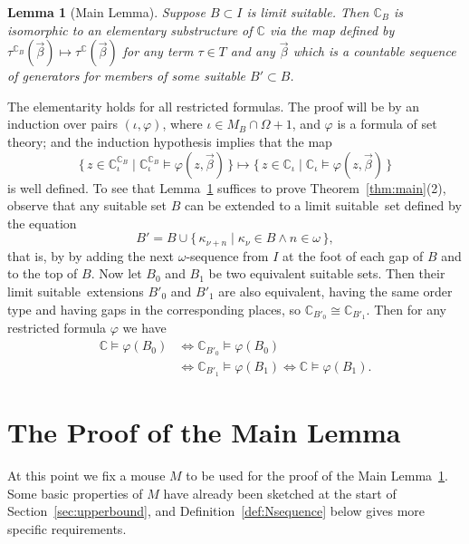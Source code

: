 \documentclass[
twoside,
]{article}
\newtheorem{lemma}[theorem]{Lemma}
\theoremstyle{definition}
\theoremstyle{remark}
\newcommand{\LS}{limit suitable}
\newcommand{\ords}{\Omega}
\renewcommand{\phi}{\varphi}
\newcommand{\set}[1]{\{\,#1\,\}}
\newcommand\chang{\mathbb{C}}
\begin{document}
\begin{lemma}[Main Lemma]
  \label{thm:mainlemma}
  Suppose $B\subset I$ is \LS. Then 
  $\chang_{B}$ is isomorphic to an elementary substructure of $\chang$
  via the map defined by
  $\tau^{\chang_B}(\vec\beta)\mapsto\tau^\chang(\vec\beta)$ for any
  term $\tau\in T$ and any $\vec \beta$ which is a countable sequence of
  generators for members of some suitable $B'\subset B$. 
\end{lemma}
The elementarity holds for all restricted formulas.  The proof will be by an induction over pairs 
$(\iota,\phi)$, where $\iota\in M_B\cap \ords+1$, and $\phi$ is a
formula of set theory; and  the induction hypothesis implies that
the map 
\begin{equation*}
  \set{z\in\chang_\iota^{\chang_B}\mid \chang_\iota^{\chang_B}\models\phi(z,\vec\beta)}\mapsto
  \set{z\in\chang_\iota\mid\chang_\iota\models\phi(z,\vec\beta)}
\end{equation*}
is well defined. 
To see that Lemma~\ref{thm:mainlemma} suffices to prove
Theorem~\ref{thm:main}(2), observe that 
any suitable set $B$ can be extended to a \LS\ set defined by the equation
\begin{equation*}
  B'=B\cup\set{\kappa_{\nu+n}\mid \kappa_{\nu}\in B\land n\in\omega}, 
\end{equation*}
that is, by by adding the next $\omega$-sequence from $I$ at the foot
of each gap of $B$ and to the top of $B$.  Now
let $B_0$ and $B_1$ be two equivalent suitable sets.  Then their \LS\
extensions $B'_0$ and $B'_1$ are also equivalent, having the same
order type and having gaps in the corresponding places, so 
$\chang_{B'_0}\cong \chang_{B'_1}$.    Then for any restricted formula
$\phi$ we have
\begin{align*}
  \chang\models \phi(B_0)&\iff \chang_{B'_0}\models\phi(B_0)\\
                         &\iff \chang_{B'_1}\models\phi(B_1)\iff \chang\models\phi(B_1).
\end{align*}

% 
\section{The Proof of the Main Lemma}
\label{sec:mainlemma}


At this point we fix a mouse $M$ to be used for 
the proof of the Main Lemma~\ref{thm:mainlemma}.   Some basic
properties of $M$ have already been 
sketched at the start of Section~\ref{sec:upperbound}, and
Definition~\ref{def:Nsequence} below gives  more specific
requirements.
\end{document}
